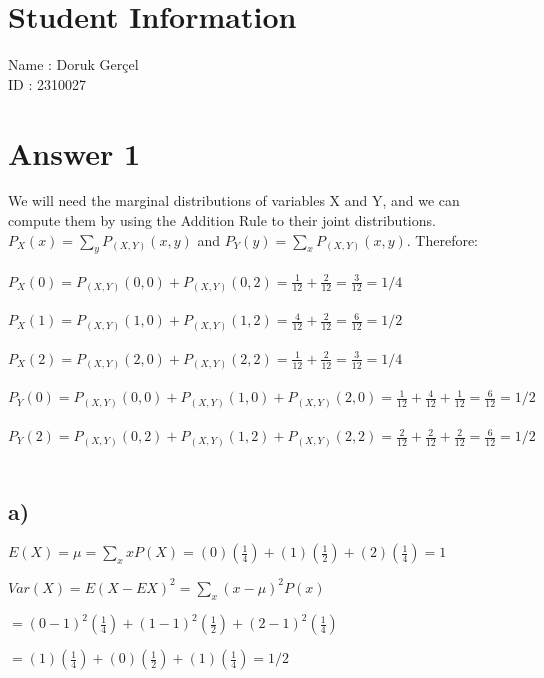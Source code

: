 \documentclass[12pt]{article}
\begin{document}
\section*{Student Information}

Name : Doruk Gerçel\\

ID : 2310027\\


\section*{Answer 1}
We will need the marginal distributions of variables X and Y, and we can compute them by using the Addition Rule to their joint distributions.\\
$P_X(x) = \sum_{y} P_{(X,Y)}(x,y)$ and $P_Y(y) = \sum_{x} P_{(X,Y)}(x,y)$. Therefore:\\ \\
$P_X(0) = P_{(X,Y)}(0,0) + P_{(X,Y)}(0,2) = \frac{1}{12} + \frac{2}{12} = \frac{3}{12} = 1/4$\\ \\
$P_X(1) = P_{(X,Y)}(1,0) + P_{(X,Y)}(1,2) = \frac{4}{12} + \frac{2}{12} = \frac{6}{12} = 1/2$\\ \\
$P_X(2) = P_{(X,Y)}(2,0) + P_{(X,Y)}(2,2) = \frac{1}{12} + \frac{2}{12} = \frac{3}{12} = 1/4$\\ \\
$P_Y(0) = P_{(X,Y)}(0,0) + P_{(X,Y)}(1,0) + P_{(X,Y)}(2,0) = \frac{1}{12} + \frac{4}{12} + \frac{1}{12} = \frac{6}{12} = 1/2$\\ \\
$P_Y(2) = P_{(X,Y)}(0,2) + P_{(X,Y)}(1,2) + P_{(X,Y)}(2,2) = \frac{2}{12} + \frac{2}{12} + \frac{2}{12} = \frac{6}{12} = 1/2$\\ \\
\subsection*{a)}
$E(X) = \mu = \sum_x xP(X) = (0)(\frac{1}{4}) + (1)(\frac{1}{2}) + (2)(\frac{1}{4}) = 1$\\ \par 
$Var(X) = E(X-EX)^2 = \sum_x(x-\mu)^2P(x)$ \\ \par 
$=(0-1)^2(\frac{1}{4}) + (1-1)^2(\frac{1}{2}) + (2-1)^2(\frac{1}{4})$ \\ \par 
$=(1)(\frac{1}{4}) + (0)(\frac{1}{2}) + (1)(\frac{1}{4}) = 1/2$
\end{document}

